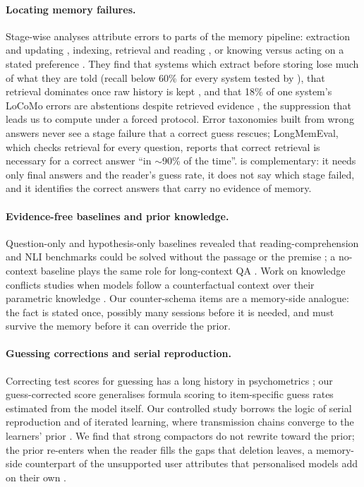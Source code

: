 \paragraph{Locating memory failures.} Stage-wise analyses attribute errors to parts of the memory pipeline: extraction
and updating \citep{chen2025halumem}, indexing, retrieval and reading \citep{wu2025longmemeval,yuan2026diagnosing}, or
knowing versus acting on a stated preference \citep{feng2026knowit}. They find that systems which extract before storing
lose much of what they are told (recall below 60\% for every system tested by \citealp{chen2025halumem}), that retrieval
dominates once raw history is kept \citep{yuan2026diagnosing}, and that 18\% of one system's LoCoMo errors are abstentions
despite retrieved evidence \citep{shu2026remem}, the suppression that leads us to compute \cpr{} under a forced protocol.
Error taxonomies built from wrong answers \citep{yuan2026diagnosing,shu2026remem} never see a stage failure that a correct
guess rescues; LongMemEval, which checks retrieval for every question, reports that correct retrieval is necessary for a
correct answer ``in $\sim$90\% of the time''. \pcme{} is complementary: it needs only final answers and the reader's guess
rate, it does not say which stage failed, and it identifies the correct answers that carry no evidence of memory.

\paragraph{Evidence-free baselines and prior knowledge.} Question-only and hypothesis-only baselines revealed that
reading-comprehension and NLI benchmarks could be solved without the passage or the premise
\citep{kaushik2018much,poliak2018hypothesis,gururangan2018annotation}; a no-context baseline plays the same role for
long-context QA \citep{longbench100}. Work on knowledge conflicts studies when models follow a counterfactual context
over their parametric knowledge \citep{longpre2021entity,xie2024adaptive,wu2024clasheval,ming2025faitheval}. Our counter-schema items are a memory-side
analogue: the fact is stated once, possibly many sessions before it is needed, and must survive the memory before it can
override the prior.

\paragraph{Guessing corrections and serial reproduction.} Correcting test scores for guessing has a long history in
psychometrics \citep{lord1968statistical}; our guess-corrected score generalises formula scoring to item-specific guess
rates estimated from the model itself. Our controlled study borrows the logic of serial reproduction
\citep{bartlett1932remembering} and of iterated learning, where transmission chains converge to the learners' prior
\citep{griffiths2007language,kirby2007innateness}. We find that strong compactors do not rewrite toward the prior; the
prior re-enters when the reader fills the gaps that deletion leaves, a memory-side counterpart of the unsupported user
attributes that personalised models add on their own \citep{sun2026mirage}.
